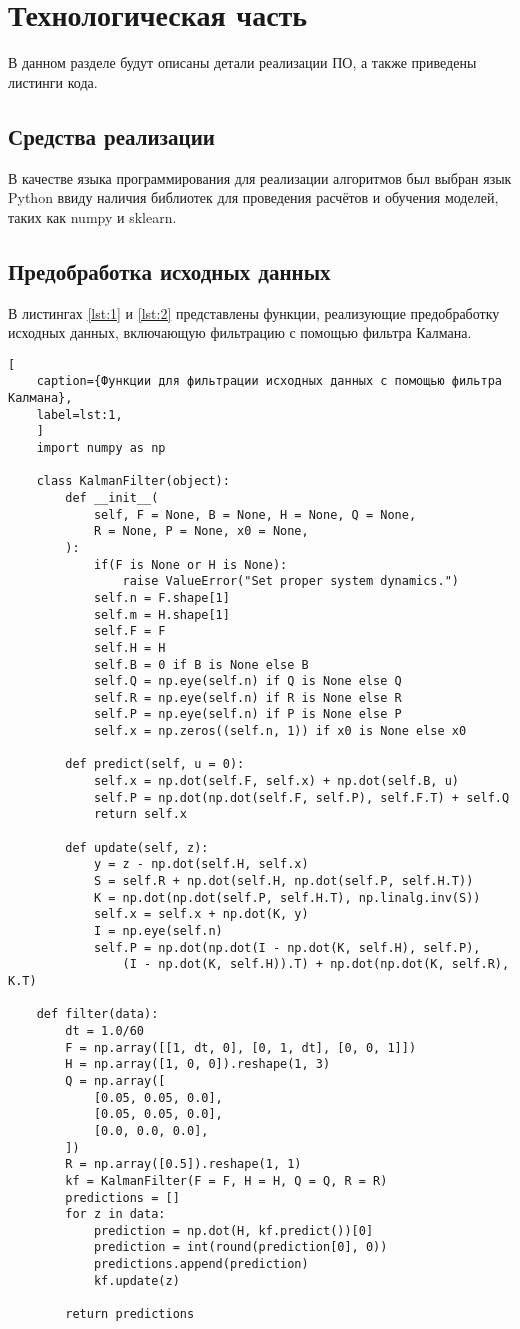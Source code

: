 \chapter{Технологическая часть}

В данном разделе будут описаны детали реализации ПО, а также приведены листинги кода.

\section{Средства реализации}

В качестве языка программирования для реализации алгоритмов был выбран язык Python ввиду наличия библиотек для проведения расчётов и обучения моделей, таких как numpy и sklearn.

\section{Предобработка исходных данных}

В листингах \ref{lst:1} и \ref{lst:2} представлены функции, реализующие предобработку исходных данных, включающую фильтрацию с помощью фильтра Калмана.

\begin{lstlisting}[
	caption={Функции для фильтрации исходных данных с помощью фильтра Калмана},
	label=lst:1,
	]
	import numpy as np
	
	class KalmanFilter(object):
		def __init__(
			self, F = None, B = None, H = None, Q = None, 
			R = None, P = None, x0 = None,
		):
			if(F is None or H is None):
				raise ValueError("Set proper system dynamics.")
			self.n = F.shape[1]
			self.m = H.shape[1]
			self.F = F
			self.H = H
			self.B = 0 if B is None else B
			self.Q = np.eye(self.n) if Q is None else Q
			self.R = np.eye(self.n) if R is None else R
			self.P = np.eye(self.n) if P is None else P
			self.x = np.zeros((self.n, 1)) if x0 is None else x0
		
		def predict(self, u = 0):
			self.x = np.dot(self.F, self.x) + np.dot(self.B, u)
			self.P = np.dot(np.dot(self.F, self.P), self.F.T) + self.Q
			return self.x
		
		def update(self, z):
			y = z - np.dot(self.H, self.x)
			S = self.R + np.dot(self.H, np.dot(self.P, self.H.T))
			K = np.dot(np.dot(self.P, self.H.T), np.linalg.inv(S))
			self.x = self.x + np.dot(K, y)
			I = np.eye(self.n)
			self.P = np.dot(np.dot(I - np.dot(K, self.H), self.P), 
				(I - np.dot(K, self.H)).T) + np.dot(np.dot(K, self.R), K.T)
	
	def filter(data): 
		dt = 1.0/60
		F = np.array([[1, dt, 0], [0, 1, dt], [0, 0, 1]])
		H = np.array([1, 0, 0]).reshape(1, 3)
		Q = np.array([
			[0.05, 0.05, 0.0],
			[0.05, 0.05, 0.0], 
			[0.0, 0.0, 0.0],
		])
		R = np.array([0.5]).reshape(1, 1)
		kf = KalmanFilter(F = F, H = H, Q = Q, R = R)
		predictions = []
		for z in data:
			prediction = np.dot(H, kf.predict())[0]
			prediction = int(round(prediction[0], 0))
			predictions.append(prediction)
			kf.update(z)
	
		return predictions
\end{lstlisting}

